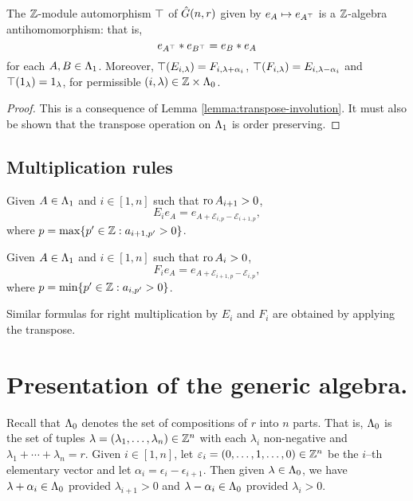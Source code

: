 \documentclass[a4paper, 11pt]{report}
\begin{document}
\begin{lemma}\label{lemma:transpose-involution-generic}
The $\mathbb{Z}$-module automorphism $\top$ of $\hat{G}(n,r)$ given by $e_A\mapsto e_{A^\top}$ is a $\mathbb{Z}$-algebra antihomomorphism: that is,
\begin{equation*}
e_{A^\top}\ast e_{B^\top} = e_B\ast e_A
\end{equation*}
for each $A,B\in{\Lambda_1}$. Moreover, $\top(E_{i,\lambda}) = F_{i,\lambda+\alpha_i}$, $\top(F_{i,\lambda}) = E_{i,\lambda - \alpha_i}$ and $\top(1_\lambda) = 1_\lambda$, for permissible $(i,\lambda)\in\mathbb{Z}\times{\Lambda_0}$.
\end{lemma}
\begin{proof}
This is a consequence of Lemma \ref{lemma:transpose-involution}. {\color{blue}It must also be shown that the transpose operation on ${\Lambda_1}$ is order preserving.}
\end{proof}

\subsection{Multiplication rules}

\begin{lemma}\label{lemma:multiplication-rule-generic}
Given $A\in{\Lambda_1}$ and $i\in[1,n]$ such that $\operatorname{ro}{A}_{i+1}>0$,
\begin{equation*}
E_ie_A = e_{A+\mathcal{E}_{i,p}-\mathcal{E}_{i+1,p}},
\end{equation*}
where $p=\max\{p'\in\mathbb{Z}: a_{i+1,p'}>0\}$.

Given $A\in{\Lambda_1}$ and $i\in[1,n]$ such that $\operatorname{ro}{A}_i>0$,
\begin{equation*}
F_ie_A = e_{A+\mathcal{E}_{i+1,p}-\mathcal{E}_{i,p}},
\end{equation*}
where $p=\min\{p'\in\mathbb{Z}: a_{i,p'}>0\}$.
\end{lemma}

Similar formulas for right multiplication by $E_i$ and $F_i$ are obtained by applying the transpose.

\section{Presentation of the generic algebra.}

Recall that ${\Lambda_0}$ denotes the set of compositions of $r$ into $n$ parts. That is, ${\Lambda_0}$ is the set of tuples $\lambda = (\lambda_1,\ldots,\lambda_n)\in\mathbb{Z}^n$ with each $\lambda_i$ non-negative and $\lambda_1 +\cdots +\lambda_n = r$. Given $i\in [1,n]$, let $\varepsilon_i = (0,\ldots,1,\ldots,0)\in\mathbb{Z}^n$ be the $i$--th elementary vector and let $\alpha_i = \epsilon_i - \epsilon_{i+1}$. Then given $\lambda\in{\Lambda_0}$, we have $\lambda + \alpha_i\in{\Lambda_0}$ provided $\lambda_{i+1}>0$ and $\lambda - \alpha_i\in{\Lambda_0}$ provided $\lambda_i>0$.
\end{document}

